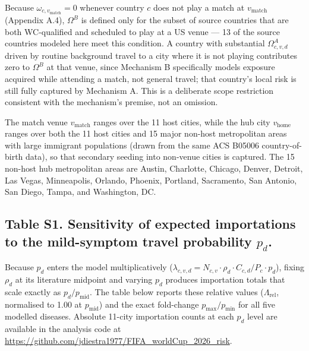 \documentclass[12pt, a4paper]{article}
\begin{document}
Because $\omega_{c,v_{\text{match}}} = 0$ whenever country $c$ does
not play a match at $v_{\text{match}}$ (Appendix A.4), $\Omega^B$ is
defined only for the subset of source countries that are both
WC-qualified and scheduled to play at a US venue --- 13 of the
source countries modeled here meet this condition. A country with
substantial $\Omega^A_{c,v,d}$ driven by routine background travel
to a city where it is not playing contributes zero to $\Omega^B$ at
that venue, since Mechanism B specifically models exposure acquired
while attending a match, not general travel; that country's local
risk is still fully captured by Mechanism A. This is a deliberate
scope restriction consistent with the mechanism's premise, not an
omission.

The match venue $v_{\text{match}}$ ranges over the 11 host cities, while the hub city $v_{\text{home}}$ ranges over both the 11 host cities and 15 major non-host metropolitan areas with large immigrant populations (drawn from the same ACS B05006 country-of-birth data), so that secondary seeding into non-venue cities
is captured. The 15 non-host hub metropolitan areas are Austin, Charlotte, Chicago,
Denver, Detroit, Las Vegas, Minneapolis, Orlando, Phoenix, Portland,
Sacramento, San Antonio, San Diego, Tampa, and Washington, DC.

\newpage

\subsection*{Table S1. Sensitivity of expected importations to the mild-symptom travel probability $p_d$.}

Because $p_d$ enters the model multiplicatively
($\lambda_{c,v,d} = N_{c,v}\cdot\rho_d\cdot C_{c,d}/P_c\cdot p_d$),
fixing $\rho_d$ at its literature midpoint and varying $p_d$ produces
importation totals that scale exactly as $p_d/p_{\text{mid}}$. The
table below reports these relative values ($\Lambda_{\text{rel}}$,
normalised to 1.00 at $p_{\text{mid}}$) and the exact fold-change
$p_{\max}/p_{\min}$ for all five modelled diseases. Absolute 11-city
importation counts at each $p_d$ level are available in the
analysis code at \url{https://github.com/jdiestra1977/FIFA\_worldCup\_2026\_risk}.
\end{document}
